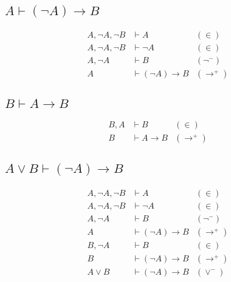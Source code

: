 \documentclass[UTF8]{ctexart}
\begin{document}
    \subsection*{$A \vdash (\lnot A) \to B$}
    \begin{align*}
        A, \lnot A, \lnot B & \vdash A & (\in) \\
        A, \lnot A, \lnot B & \vdash \lnot A & (\in) \\
        A, \lnot A & \vdash B & (\lnot^{-}) \\
        A & \vdash (\lnot A) \to B & (\to^{+})
    \end{align*}

    \subsection*{$B \vdash A \to B$}
    \begin{align*}
        B, A & \vdash B & (\in) \\
        B & \vdash A \to B & (\to^{+})
    \end{align*}

    \subsection*{$A \lor B \vdash (\lnot A) \to B$}

    \begin{align*}
        A, \lnot A, \lnot B & \vdash A & (\in) \\
        A, \lnot A, \lnot B & \vdash \lnot A & (\in) \\
        A, \lnot A & \vdash B & (\lnot^{-}) \\
        A & \vdash (\lnot A) \to B & (\to^{+}) \\
        B, \lnot A & \vdash B & (\in) \\
        B & \vdash (\lnot A) \to B & (\to^{+}) \\
        A \lor B & \vdash (\lnot A) \to B & (\lor^{-})
    \end{align*}


        
\end{document}
